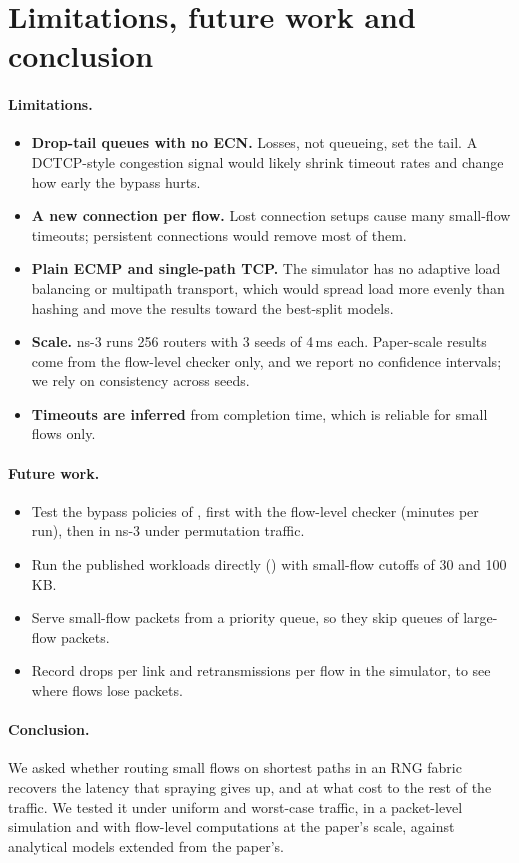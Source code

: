 \section{Limitations, future work and conclusion}
\label{sec:conclusion}

\paragraph{Limitations.}
\begin{itemize}
  \item \textbf{Drop-tail queues with no ECN.} Losses, not queueing, set the tail. A DCTCP-style congestion signal would likely shrink timeout rates and change how early the bypass hurts.
  \item \textbf{A new connection per flow.} Lost connection setups cause many small-flow timeouts; persistent connections would remove most of them.
  \item \textbf{Plain ECMP and single-path TCP.} The simulator has no adaptive load balancing or multipath transport, which would spread load more evenly than hashing and move the results toward the best-split models.
  \item \textbf{Scale.} ns-3 runs 256 routers with 3 seeds of 4\,ms each. Paper-scale results come from the flow-level checker only, and we report no confidence intervals; we rely on consistency across seeds.
  \item \textbf{Timeouts are inferred} from completion time, which is reliable for small flows only.
\end{itemize}

\paragraph{Future work.}
\begin{itemize}
  \item Test the bypass policies of , first with the flow-level checker (minutes per run), then in ns-3 under permutation traffic.
  \item Run the published workloads directly () with small-flow cutoffs of 30 and 100\,KB.
  \item Serve small-flow packets from a priority queue, so they skip queues of large-flow packets.
  \item Record drops per link and retransmissions per flow in the simulator, to see where flows lose packets.
\end{itemize}

\paragraph{Conclusion.}
We asked whether routing small flows on shortest paths in an RNG fabric recovers the latency that spraying gives up, and at what cost to the rest of the traffic. We tested it under uniform and worst-case traffic, in a packet-level simulation and with flow-level computations at the paper's scale, against analytical models extended from the paper's.
